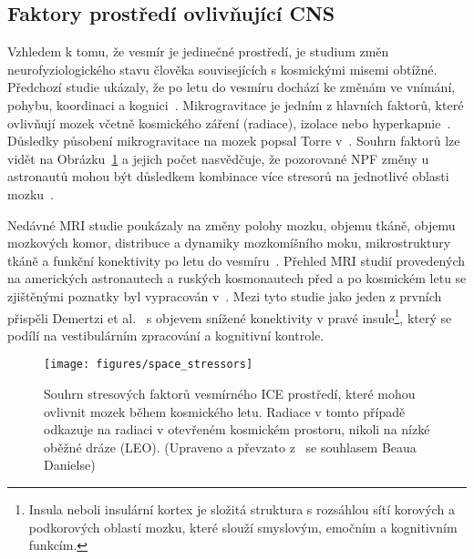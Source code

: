 \subsection{Faktory prostředí ovlivňující CNS}
\label{subsection:faktory_prostredi_zmeny_cns}
Vzhledem k tomu, že vesmír je jedinečné prostředí, je studium změn
neurofyziologického stavu člověka souvisejících s kosmickými misemi obtížné.
Předchozí studie ukázaly, že po letu do vesmíru dochází ke změnám ve vnímání,
pohybu, koordinaci a kognici~\cite{Moore2019}. Mikrogravitace je jedním z
hlavních faktorů, které ovlivňují mozek včetně kosmického záření (radiace),
izolace nebo hyperkapnie~\cite{Roy2021}. Důsledky působení mikrogravitace na
mozek popsal Torre v~\cite{Torre2014}. Souhrn faktorů lze vidět na
Obrázku~\ref{fig:factors_neuro} a jejich počet nasvědčuje, že pozorované
\gls{NPF} změny u astronautů mohou být důsledkem kombinace více stresorů na
jednotlivé oblasti mozku~\cite{Roy2021}.

Nedávné MRI studie poukázaly na změny polohy mozku, objemu tkáně, objemu
mozkových komor, distribuce a dynamiky mozkomíšního moku, mikrostruktury tkáně a
funkční konektivity po letu do
vesmíru~\cite{Ombergen2019,Pechenkova2019,Roberts2017,Demertzi2015,Kramer2020}.
Přehled \gls{MRI} studií provedených na amerických astronautech a ruských
kosmonautech před a po kosmickém letu se zjištěnými poznatky byl vypracován
v~\cite{Roy2021}. Mezi tyto studie jako jeden z prvních přispěli Demertzi et
al.~\cite{Demertzi2015} s objevem snížené konektivity v pravé
insule\footnote{Insula neboli insulární kortex je složitá struktura s rozsáhlou
sítí korových a podkorových oblastí mozku, které slouží smyslovým, emočním a
kognitivním funkcím.}, který se podílí na vestibulárním zpracování a kognitivní
kontrole.

\begin{figure}[!htb]
    \begin{center}
        \texttt{[image: figures/space\_stressors]}
        \caption{Souhrn stresových faktorů vesmírného \gls{ICE} prostředí, které
            mohou ovlivnit mozek během kosmického letu. Radiace v tomto případě
            odkazuje na radiaci v otevřeném kosmickém prostoru, nikoli na nízké
            oběžné dráze (\gls{LEO}). (Upraveno a převzato
            z~\cite{Roy2021,Hodkinson2017} se souhlasem Beaua Danielse)}
        \label{fig:factors_neuro}
    \end{center}
\end{figure}

